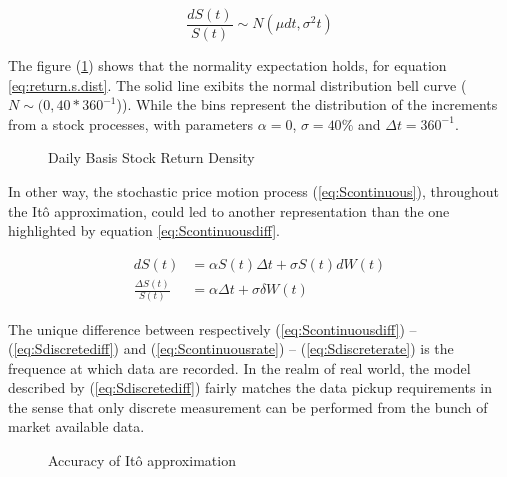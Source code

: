 \documentclass[12pt]{report}
\newcommand{\dBm}{dW\left(t\right)}
\newcommand{\DBm}{\delta{W\left(t\right)}}
\newcommand{\Dt}{\Delta t}
\newcommand{\St}{S\left(t\right)}
\newcommand{\dSt}{dS\left(t\right)}
\newcommand{\DSt}{\Delta S\left(t\right)}
\newcommand{\dSr}{\frac{\dSt}{\St}}
\newcommand{\DSr}{\frac{\DSt}{\St}}
\newcommand{\Sdiscretediff}{d\St &= \alpha \St \Dt + \sigma \St \dBm}
\newcommand{\Sdiscreterate}{\DSr &= \alpha \Delta t + \sigma \DBm}
\begin{document}
\begin{center}
  \begin{equation}
     \dSr \sim N(\mu dt, \sigma^2 t)
     \label{eq:return.s.dist}
  \end{equation}
\end{center}


The figure (\ref{plot:returnDensity}) shows that the normality expectation holds, for equation \ref{eq:return.s.dist}. The solid line exibits the normal distribution bell curve ($N \sim (0, 40 * 360^{-1}$)). While the bins represent the distribution of the increments from a stock processes, with parameters $\alpha = 0$, $\sigma = 40\%$ and $\Dt = 360^{-1}$.

 
\begin{figure}[!h]
\centering

\caption{Daily Basis Stock Return Density}
\label{plot:returnDensity}
\end{figure}



In other way, the stochastic price motion process (\ref{eq:Scontinuous}), throughout the Itô approximation, could led to another representation than the one highlighted by equation \ref{eq:Scontinuousdiff}.

\begin{center}
  \begin{subequations}
    \begin{align}
      \Sdiscretediff \label{eq:Sdiscretediff} \\
      \Sdiscreterate \label{eq:Sdiscreterate}
    \end{align}
  \end{subequations}
\end{center}

The unique difference between respectively (\ref{eq:Scontinuousdiff}) -- (\ref{eq:Sdiscretediff}) and (\ref{eq:Scontinuousrate}) -- (\ref{eq:Sdiscreterate}) is the frequence at which data are recorded.
In the realm of real world, the model described by (\ref{eq:Sdiscretediff}) fairly matches the data pickup requirements in the sense that only discrete measurement can be performed from the bunch of market available data.
 

\begin{figure}[h]
\centering

\caption{Accuracy of Itô approximation}
\label{plot:ItoAccuracy}
\end{figure}
\end{document}
